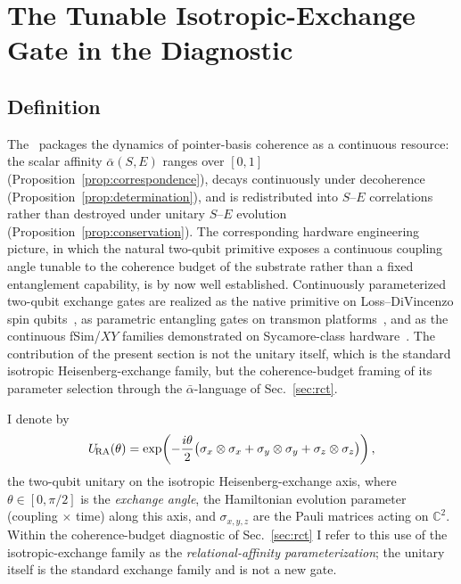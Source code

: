 
\section{The Tunable Isotropic-Exchange Gate in the \RCF{} Diagnostic}
\label{sec:gate}

\subsection{Definition}

The \RCF~packages the dynamics of pointer-basis coherence as a
continuous resource: the scalar affinity $\bar\alpha(S,E)$ ranges over
$[0,1]$ (Proposition~\ref{prop:correspondence}), decays continuously
under decoherence (Proposition~\ref{prop:determination}), and is
redistributed into $S$--$E$ correlations rather than destroyed
under unitary $S$--$E$ evolution (Proposition~\ref{prop:conservation}).
The corresponding hardware engineering picture, in which the natural two-qubit primitive exposes a continuous coupling angle tunable to the coherence budget of the substrate rather than a fixed entanglement capability, is by now well established.
Continuously parameterized two-qubit exchange gates are realized as
the native primitive on Loss--DiVincenzo spin
qubits~\cite{LossDiVincenzo1998}, as parametric entangling gates on
transmon platforms~\cite{Caldwell2018}, and as the continuous fSim/$XY$
families demonstrated on Sycamore-class
hardware~\cite{Foxen2020,Abrams2020,Lacroix2020}.
The contribution of the present section is not the unitary itself, which is the standard isotropic Heisenberg-exchange family, but the
coherence-budget framing of its parameter selection through the
$\bar\alpha$-language of Sec.~\ref{sec:rct}.

\begin{definition}
\label{def:ura}
I denote by
\begin{equation}
  U_{\!\mathrm{RA}}(\theta) = \exp\!\left(-\frac{i\theta}{2}
    \bigl(\sigma_x \otimes \sigma_x
         + \sigma_y \otimes \sigma_y
         + \sigma_z \otimes \sigma_z\bigr)\right),
  \label{eq:URA}
\end{equation}
the two-qubit unitary on the isotropic Heisenberg-exchange axis,
where $\theta \in [0, \pi/2]$ is the \emph{exchange angle}, the Hamiltonian evolution parameter (coupling$\,\times\,$time) along this axis, and $\sigma_{x,y,z}$ are the Pauli matrices acting on
$\mathbb{C}^2$.
Within the \RCF{} coherence-budget diagnostic of Sec.~\ref{sec:rct} I
refer to this use of the isotropic-exchange family as the
\emph{relational-affinity parameterization}; the unitary itself is the
standard exchange family and is not a new gate.
\end{definition}

